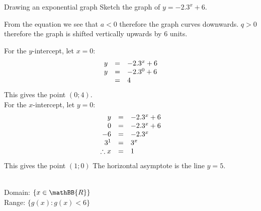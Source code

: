  
\begin{wex}{Drawing an exponential graph}
{
Sketch the graph of $y=-2.3^{x}+6$.}
{
From the equation we see that $a<0$ therefore the graph curves downwards. $q>0$ therefore the graph is shifted vertically upwards by $6$ units.

For the $y$-intercept, let $x=0$:
\begin{equation*}
\begin{array}{ccl}\hfill y& =& -2.3^{x}+6\hfill \\
 \hfill y& =& -2.3^{0}+6\hfill \\
 & =& 4\hfill \\

\end{array}
\end{equation*}
This gives the point $(0;4)$.\\

For the $x$-intercept, let $y=0$:
\begin{equation*}
\begin{array}{ccl}\hfill y& =& -2.3^{x}+6\hfill \\
 \hfill 0& =& -2.3^{x}+6\hfill \\
 \hfill -6& =& -2.3^{x}\hfill \\
 \hfill {3}^{1}& =& {3}^{x}\hfill \\
\hfill \therefore x & =& 1 
\end{array}
\end{equation*}
This gives the point $(1; 0)$
 The horizontal asymptote is the line $y=5$.



\\
Domain: $\{x \in \mathBB{R}\}$\\
Range: $\{g(x): g(x) <6\}$\\

}
\end{wex}




